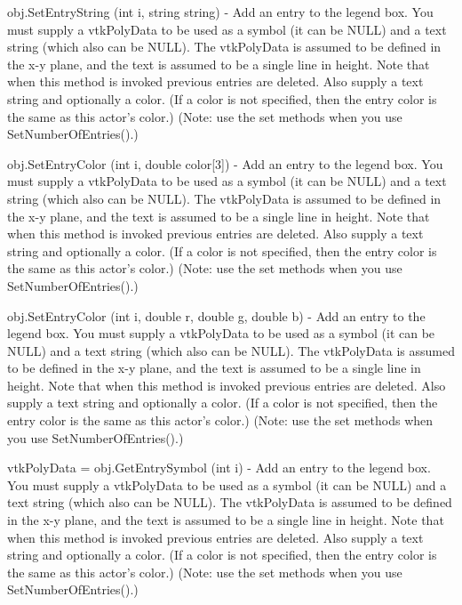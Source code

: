 \begin{DoxyItemize}
\item {\ttfamily obj.\-Set\-Entry\-String (int i, string string)} -\/ Add an entry to the legend box. You must supply a vtk\-Poly\-Data to be used as a symbol (it can be N\-U\-L\-L) and a text string (which also can be N\-U\-L\-L). The vtk\-Poly\-Data is assumed to be defined in the x-\/y plane, and the text is assumed to be a single line in height. Note that when this method is invoked previous entries are deleted. Also supply a text string and optionally a color. (If a color is not specified, then the entry color is the same as this actor's color.) (Note\-: use the set methods when you use Set\-Number\-Of\-Entries().)  
\item {\ttfamily obj.\-Set\-Entry\-Color (int i, double color\mbox{[}3\mbox{]})} -\/ Add an entry to the legend box. You must supply a vtk\-Poly\-Data to be used as a symbol (it can be N\-U\-L\-L) and a text string (which also can be N\-U\-L\-L). The vtk\-Poly\-Data is assumed to be defined in the x-\/y plane, and the text is assumed to be a single line in height. Note that when this method is invoked previous entries are deleted. Also supply a text string and optionally a color. (If a color is not specified, then the entry color is the same as this actor's color.) (Note\-: use the set methods when you use Set\-Number\-Of\-Entries().)  
\item {\ttfamily obj.\-Set\-Entry\-Color (int i, double r, double g, double b)} -\/ Add an entry to the legend box. You must supply a vtk\-Poly\-Data to be used as a symbol (it can be N\-U\-L\-L) and a text string (which also can be N\-U\-L\-L). The vtk\-Poly\-Data is assumed to be defined in the x-\/y plane, and the text is assumed to be a single line in height. Note that when this method is invoked previous entries are deleted. Also supply a text string and optionally a color. (If a color is not specified, then the entry color is the same as this actor's color.) (Note\-: use the set methods when you use Set\-Number\-Of\-Entries().)  
\item {\ttfamily vtk\-Poly\-Data = obj.\-Get\-Entry\-Symbol (int i)} -\/ Add an entry to the legend box. You must supply a vtk\-Poly\-Data to be used as a symbol (it can be N\-U\-L\-L) and a text string (which also can be N\-U\-L\-L). The vtk\-Poly\-Data is assumed to be defined in the x-\/y plane, and the text is assumed to be a single line in height. Note that when this method is invoked previous entries are deleted. Also supply a text string and optionally a color. (If a color is not specified, then the entry color is the same as this actor's color.) (Note\-: use the set methods when you use Set\-Number\-Of\-Entries().)  

\end{DoxyItemize}
